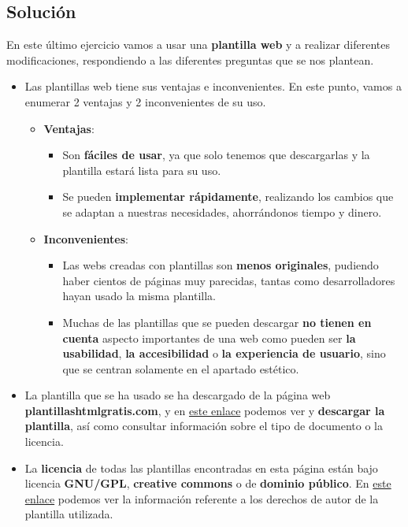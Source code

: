 \subsection{Solución}
En este último ejercicio vamos a usar una \textbf{plantilla web} y a realizar diferentes modificaciones, respondiendo a las diferentes preguntas que se nos plantean.

\begin{itemize}
    \item Las plantillas web tiene sus ventajas e inconvenientes. En este punto, vamos a enumerar 2 ventajas y 2 inconvenientes de su uso.
    \begin{itemize}
        \item \textbf{Ventajas}:
        \begin{itemize}
            \item Son \textbf{fáciles de usar}, ya que solo tenemos que descargarlas y la plantilla estará lista para su uso.
            \item Se pueden \textbf{implementar rápidamente}, realizando los cambios que se adaptan a nuestras necesidades, ahorrándonos tiempo y dinero.
        \end{itemize}

        \item \textbf{Inconvenientes}:
        \begin{itemize}
            \item Las webs creadas con plantillas son \textbf{menos originales}, pudiendo haber cientos de páginas muy parecidas, tantas como desarrolladores hayan usado la misma plantilla.
            \item Muchas de las plantillas que se pueden descargar \textbf{no tienen en cuenta} aspecto importantes de una web como pueden ser \textbf{la usabilidad}, \textbf{la accesibilidad} o \textbf{la experiencia de usuario}, sino que se centran solamente en el apartado estético.
        \end{itemize}
    \end{itemize}

    \item La plantilla que se ha usado se ha descargado de la página web \textbf{plantillashtmlgratis.com}, y en \href{https://plantillashtmlgratis.com/todas-las-plantillas/plantilla/plantillas-html-gratuita-para-descargar-koppee/}{este enlace} podemos ver y \textbf{descargar la plantilla}, así como consultar información sobre el tipo de documento o la licencia.

    \item La \textbf{licencia} de todas las plantillas encontradas en esta página están bajo licencia \textbf{GNU/GPL}, \textbf{creative commons} o de \textbf{dominio público}. En \href{https://plantillashtmlgratis.com/derechos-de-autor/}{este enlace} podemos ver la información referente a los derechos de autor de la plantilla utilizada.


\end{itemize}
